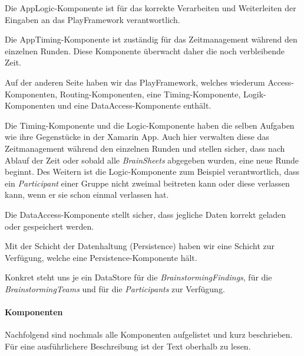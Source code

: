 Die AppLogic-Komponente ist für das korrekte Verarbeiten und Weiterleiten der Eingaben an das PlayFramework verantwortlich.

Die AppTiming-Komponente ist zuständig für das Zeitmanagement während den einzelnen Runden. Diese Komponente überwacht daher die noch verbleibende Zeit.

Auf der anderen Seite haben wir das PlayFramework, welches wiederum Access-Komponenten, Routing-Komponenten, eine Timing-Komponente, Logik-Komponenten und eine DataAccess-Komponente enthält.

Die Timing-Komponente und die Logic-Komponente haben die selben Aufgaben wie ihre Gegenstücke in der Xamarin App. Auch hier verwalten diese das Zeitmanagement während den einzelnen Runden und stellen sicher, dass nach Ablauf der Zeit oder sobald alle \textit{BrainSheets} abgegeben wurden, eine neue Runde beginnt. Des Weitern ist die Logic-Komponente zum Beispiel verantwortlich, dass ein \textit{Participant} einer Gruppe nicht zweimal beitreten kann oder diese verlassen kann, wenn er sie schon einmal verlassen hat. 

Die DataAccess-Komponente stellt sicher, dass jegliche Daten korrekt geladen oder gespeichert werden.

Mit der Schicht der Datenhaltung (Persistence) haben wir eine Schicht zur Verfügung, welche eine Persistence-Komponente hält. 

Konkret steht uns je ein DataStore für die \textit{BrainstormingFindings}, für die \textit{BrainstormingTeams} und für die \textit{Participants} zur Verfügung.


\paragraph*{Komponenten}
Nachfolgend sind nochmals alle Komponenten aufgelistet und kurz beschrieben. Für eine ausführlichere Beschreibung ist der Text oberhalb zu lesen.

